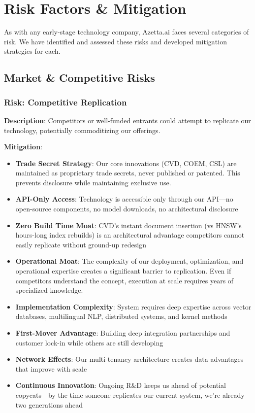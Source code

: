 \section{Risk Factors \& Mitigation}

As with any early-stage technology company, Azetta.ai faces several categories of risk. We have identified and assessed these risks and developed mitigation strategies for each.

\subsection{Market \& Competitive Risks}

\subsubsection{Risk: Competitive Replication}
\textbf{Description}: Competitors or well-funded entrants could attempt to replicate our technology, potentially commoditizing our offerings.

\textbf{Mitigation}:
\begin{itemize}
    \item \textbf{Trade Secret Strategy}: Our core innovations (CVD, COEM, CSL) are maintained as proprietary trade secrets, never published or patented. This prevents disclosure while maintaining exclusive use.
    \item \textbf{API-Only Access}: Technology is accessible only through our API—no open-source components, no model downloads, no architectural disclosure
    \item \textbf{Zero Build Time Moat}: CVD's instant document insertion (vs HNSW's hours-long index rebuilds) is an architectural advantage competitors cannot easily replicate without ground-up redesign
    \item \textbf{Operational Moat}: The complexity of our deployment, optimization, and operational expertise creates a significant barrier to replication. Even if competitors understand the concept, execution at scale requires years of specialized knowledge.
    \item \textbf{Implementation Complexity}: System requires deep expertise across vector databases, multilingual NLP, distributed systems, and kernel methods
    \item \textbf{First-Mover Advantage}: Building deep integration partnerships and customer lock-in while others are still developing
    \item \textbf{Network Effects}: Our multi-tenancy architecture creates data advantages that improve with scale
    \item \textbf{Continuous Innovation}: Ongoing R\&D keeps us ahead of potential copycats—by the time someone replicates our current system, we're already two generations ahead
\end{itemize}

